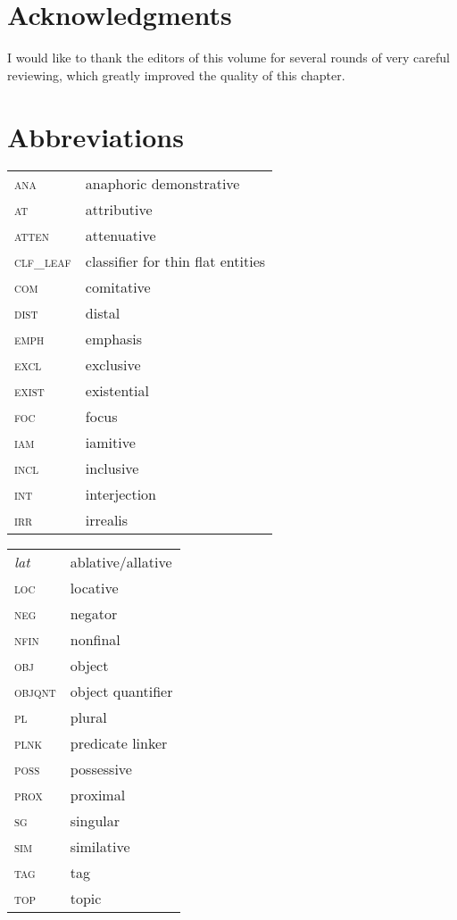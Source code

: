 \documentclass[output=paper,colorlinks,citecolor=brown
\ChapterDOI{10.5281/zenodo.15697587}
]{langscibook}
\begin{document}
\section*{Acknowledgments}
I would like to thank the editors of this volume for several rounds of very careful reviewing, which greatly improved the quality of this chapter.

\section*{Abbreviations}
\begin{tabularx}{.5\textwidth}[t]{@{}lQ@{}}
\textsc{ana} & anaphoric demonstrative \\
\textsc{at} & attributive \\
\textsc{atten} & attenuative \\
\textsc{clf\_leaf} & classifier for thin flat entities\\
\textsc{com} & comitative\\
\textsc{dist} & distal\\
\textsc{emph} & emphasis \\
\textsc{excl} & exclusive\\
\textsc{exist} & existential \\
\textsc{foc} & focus\\
\textsc{iam} & iamitive\\
\textsc{incl} & inclusive\\
\textsc{int} & interjection\\
\textsc{irr} & irrealis\\
\end{tabularx}%
\begin{tabularx}{.5\textwidth}[t]{@{}lQ@{}}
\textit{lat} & ablative/allative\\
\textsc{loc} & locative\\
\textsc{neg} & negator \\
\textsc{nfin} & nonfinal \\
\textsc{obj} & object \\
\textsc{objqnt} & object quantifier \\
\textsc{pl} & plural\\
\textsc{plnk} & predicate linker \\
\textsc{poss} & possessive\\
\textsc{prox} & proximal\\
\textsc{sg} & singular\\
\textsc{sim} & similative\\
\textsc{tag} & tag \\
\textsc{top} & topic\\
\end{tabularx}



\sloppy
\printbibliography[heading=subbibliography,notkeyword=this]
\end{document}
